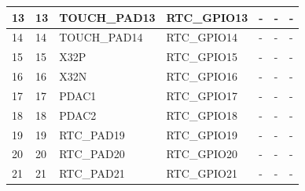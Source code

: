 \begin{longtable}[c]{|p{2.3cm}|p{1.5cm}|p{2.3cm}|p{2.2cm}|p{2.2cm}|p{2.2cm}|p{2.6cm}| }
\hline
13 & 13 & TOUCH\_PAD13   & RTC\_GPIO13       & -     & -  &  -         \\
\hline
14 & 14 & TOUCH\_PAD14   & RTC\_GPIO14       & -     & -  &  -         \\
\hline
15 & 15 &  X32P & RTC\_GPIO15           & -     & -  &  -         \\
\hline
16 & 16 & X32N & RTC\_GPIO16           &  -     & -  &  -         \\
\hline
17 & 17 & PDAC1 & RTC\_GPIO17           & -     & -  &  -         \\
\hline
18 & 18 & PDAC2 & RTC\_GPIO18           & -     & -  &  -         \\
\hline
19 & 19 & RTC\_PAD19 & RTC\_GPIO19           & -     & -  &  -         \\
\hline
20 & 20 & RTC\_PAD20 & RTC\_GPIO20           &  -    & -  &  -         \\
\hline
21 & 21 & RTC\_PAD21 & RTC\_GPIO21           &  -    & -  &  -         \\
\hline

\end{longtable}
